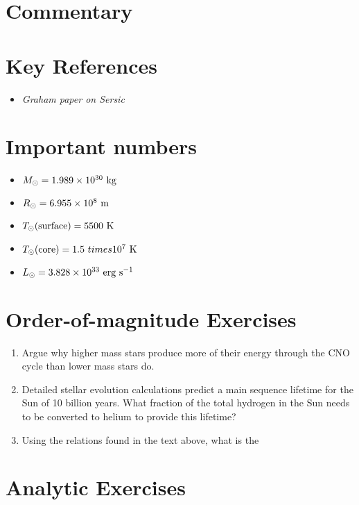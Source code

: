 \section{Commentary}

\section{Key References}

\begin{itemize}
  \item {\it Graham paper on Sersic}
\end{itemize}

\citet{gunn06a}

\section{Important numbers}

\begin{itemize}
\item $M_{\odot} = 1.989 \times 10^{30} {\rm ~kg} $
\item $R_{\odot} = 6.955 \times 10^{8} {\rm ~m} $
\item $T_{\odot}{\rm (surface)} = 5500 {\rm ~K} $
\item $T_{\odot}{\rm (core)} = 1.5 \ times 10^7 {\rm ~K} $
\item $L_{\odot} = 3.828 \times 10^{33} {\rm ~erg} {\rm ~s}^{-1}$
\end{itemize}

\section{Order-of-magnitude Exercises}

\begin{enumerate} 
\item Argue why higher mass stars produce more of their energy through
    the CNO cycle than lower mass stars do.
\item Detailed stellar evolution calculations predict a main sequence
    lifetime for the Sun of 10 billion years. What fraction of the
    total hydrogen in the Sun needs to be converted to helium to
    provide this lifetime?
\item Using the relations found in the text above, what is the 
\end{enumerate} 

\section{Analytic Exercises}


